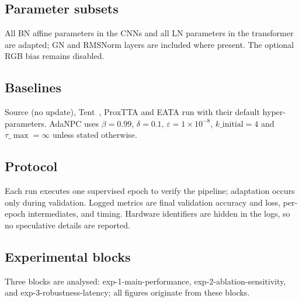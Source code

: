 \documentclass{article} %
\begin{document}
\subsection{Parameter subsets}
All BN affine parameters in the CNNs and all LN parameters in the transformer are adapted; GN and RMSNorm layers are included where present. The optional RGB bias remains disabled.
\subsection{Baselines}
Source (no update), Tent~\cite{wang-2020-tent}, ProxTTA and EATA run with their default hyper-parameters. AdaNPC uses \(\beta=0.99\), \(\delta=0.1\), \(\varepsilon=1\times 10^{-8}\), \(k\_{\mathrm{initial}}=4\) and \(\tau\_{\max}=\infty\) unless stated otherwise.
\subsection{Protocol}
Each run executes one supervised epoch to verify the pipeline; adaptation occurs only during validation. Logged metrics are final validation accuracy and loss, per-epoch intermediates, and timing. Hardware identifiers are hidden in the logs, so no speculative details are reported.
\subsection{Experimental blocks}
Three blocks are analysed: exp-1-main-performance, exp-2-ablation-sensitivity, and exp-3-robustness-latency; all figures originate from these blocks.
\end{document}

